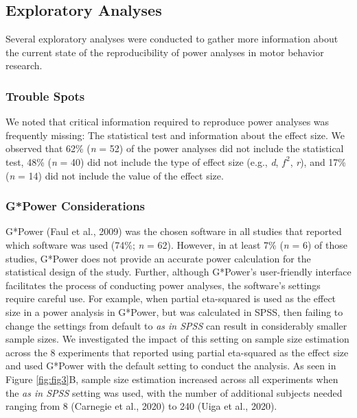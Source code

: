 \documentclass[
  man, donotrepeattitle,mask,floatsintext]{apa7}
\begin{document}
\clearpage

\hypertarget{exploratory-analyses}{%
\subsection{Exploratory Analyses}\label{exploratory-analyses}}

Several exploratory analyses were conducted to gather more information about the current state of the reproducibility of power analyses in motor behavior research.

\hypertarget{trouble-spots}{%
\subsubsection{Trouble Spots}\label{trouble-spots}}

We noted that critical information required to reproduce power analyses was frequently missing: The statistical test and information about the effect size. We observed that 62\% (\emph{n} = 52) of the power analyses did not include the statistical test, 48\% (\emph{n} = 40) did not include the type of effect size (e.g., \emph{d}, \(f^2\), \emph{r}), and 17\% (\emph{n} = 14) did not include the value of the effect size.

\hypertarget{gpower-considerations}{%
\subsubsection{G*Power Considerations}\label{gpower-considerations}}

G*Power (Faul et al., 2009) was the chosen software in all studies that reported which software was used (74\%; \emph{n} = 62). However, in at least 7\% (\emph{n} = 6) of those studies, G*Power does not provide an accurate power calculation for the statistical design of the study. Further, although G*Power's user-friendly interface facilitates the process of conducting power analyses, the software's settings require careful use. For example, when partial eta-squared is used as the effect size in a power analysis in G*Power, but was calculated in SPSS, then failing to change the settings from default to \emph{as in SPSS} can result in considerably smaller sample sizes. We investigated the impact of this setting on sample size estimation across the 8 experiments that reported using partial eta-squared as the effect size and used G*Power with the default setting to conduct the analysis. As seen in Figure \ref{fig:fig3}B, sample size estimation increased across all experiments when the \emph{as in SPSS} setting was used, with the number of additional subjects needed ranging from 8 (Carnegie et al., 2020) to 240 (Uiga et al., 2020).
\end{document}
